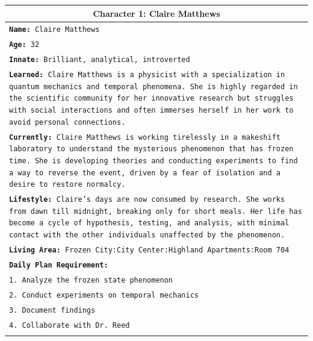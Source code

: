 \documentclass[letterpaper]{article} %
\begin{document}
\begin{small}
\begin{longtable}{p{\textwidth}}
    \multicolumn{1}{c}{\textbf{Character 1: Claire Matthews}} \\
    \midrule
    \texttt{\textbf{Name:} Claire Matthews} \\
    \texttt{\textbf{Age:} 32} \\
    \texttt{\textbf{Innate:} Brilliant, analytical, introverted} \\
    \texttt{\textbf{Learned:} Claire Matthews is a physicist with a specialization in quantum mechanics and temporal phenomena. She is highly regarded in the scientific community for her innovative research but struggles with social interactions and often immerses herself in her work to avoid personal connections.} \\
    \texttt{\textbf{Currently:} Claire Matthews is working tirelessly in a makeshift laboratory to understand the mysterious phenomenon that has frozen time. She is developing theories and conducting experiments to find a way to reverse the event, driven by a fear of isolation and a desire to restore normalcy.} \\
    \texttt{\textbf{Lifestyle:} Claire's days are now consumed by research. She works from dawn till midnight, breaking only for short meals. Her life has become a cycle of hypothesis, testing, and analysis, with minimal contact with the other individuals unaffected by the phenomenon.} \\
    \texttt{\textbf{Living Area:} Frozen City:City Center:Highland Apartments:Room 704} \\
    \texttt{\textbf{Daily Plan Requirement:}} \\
    \texttt{1. Analyze the frozen state phenomenon} \\
    \texttt{2. Conduct experiments on temporal mechanics} \\
    \texttt{3. Document findings} \\
    \texttt{4. Collaborate with Dr. Reed} \\
    \\
    \midrule
    

\end{longtable}
\end{small}
\end{document}
